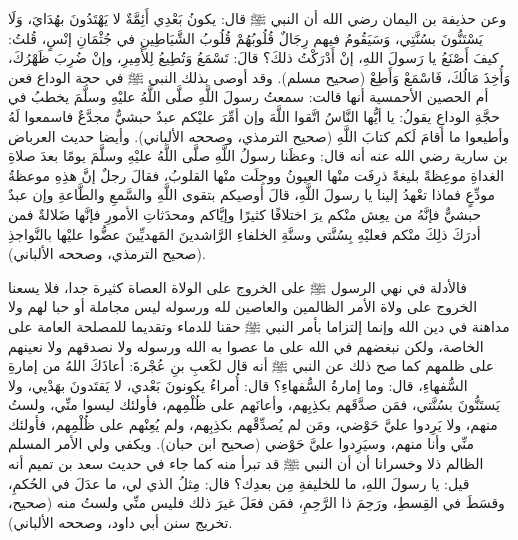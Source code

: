 وعن حذيفة بن اليمان رضي الله أن النبي ﷺ قال: يكونُ بَعْدِي أَئِمَّةٌ لا يَهْتَدُونَ بهُدَايَ، وَلَا يَسْتَنُّونَ بسُنَّتِي، وَسَيَقُومُ فيهم رِجَالٌ قُلُوبُهُمْ قُلُوبُ الشَّيَاطِينِ في جُثْمَانِ إنْسٍ، قُلتُ: كيفَ أَصْنَعُ يا رَسولَ اللهِ، إنْ أَدْرَكْتُ ذلكَ؟ قالَ: تَسْمَعُ وَتُطِيعُ لِلأَمِيرِ، وإنْ ضُرِبَ ظَهْرُكَ، وَأُخِذَ مَالُكَ، فَاسْمَعْ وَأَطِعْ {\footnotesize (صحيح مسلم)}. وقد أوصى بذلك النبي ﷺ في حجة الوداع فعن أم الحصين الأحمسية أنها قالت: سمعتُ رسولَ اللَّهِ صلَّى اللَّهُ عليْهِ وسلَّمَ يخطبُ في حجَّةِ الوداعِ   يقولُ: يا أيُّها النَّاسُ اتَّقوا اللَّهَ وإن أمِّرَ عليْكم عبدٌ حبشيٌّ مجدَّعٌ فاسمعوا لَهُ وأطيعوا ما أقامَ لَكم كتابَ اللَّهِ  {\footnotesize (صحيح الترمذي، وصححه الألباني)}. وأيضا حديث العرباض بن سارية رضي الله عنه أنه قال: وعظَنا رسولُ اللَّهِ صلَّى اللَّهُ عليْهِ وسلَّمَ يومًا بعدَ صلاةِ الغداةِ موعِظةً بليغةً ذرِفَت منْها العيونُ ووجِلَت منْها القلوبُ، فقالَ رجلٌ إنَّ هذِهِ موعظةُ مودِّعٍ فماذا تعْهدُ إلينا يا رسولَ اللَّهِ، قالَ أوصيكم بتقوى اللَّهِ والسَّمعِ والطَّاعةِ وإن عبدٌ حبشيٌّ فإنَّهُ من يعِش منْكم يرَ اختلافًا كثيرًا وإيَّاكم ومحدَثاتِ الأمورِ فإنَّها ضَلالةٌ فمن أدرَكَ ذلِكَ منْكم فعليْهِ بِسُنَّتي وسنَّةِ الخلفاءِ الرَّاشدينَ المَهديِّينَ عضُّوا عليْها بالنَّواجذِ {\footnotesize (صحيح الترمذي، وصححه الألباني)}.

فالأدلة في نهي الرسول ﷺ على الخروج على الولاة العصاة كثيرة جدا، فلا يسعنا الخروج على ولاة الأمر الظالمين والعاصين لله ورسوله ليس مجاملة أو حبا لهم ولا مداهنة في دين الله وإنما إلتزاما بأمر النبي ﷺ حقنا للدماء وتقديما للمصلحة العامة على الخاصة، ولكن نبغضهم في الله على ما عصوا به الله ورسوله ولا نصدقهم ولا نعينهم على ظلمهم كما صح ذلك عن النبي ﷺ أنه قال لكَعبِ بنِ عُجْرةَ: أعاذَكَ اللهُ من إمارةِ السُّفهاءِ، قال: وما إمارةُ السُّفهاءِ؟ قال: أُمراءُ يكونونَ بَعْدي، لا يَقتَدونَ بهَدْيي، ولا يَستَنُّونَ بسُنَّتي، فمَن صدَّقَهم بكذِبِهم، وأعانَهم على ظُلْمِهم، فأولئك ليسوا منِّي، ولستُ منهم، ولا يَرِدوا عليَّ حَوْضي، ومَن لم يُصدِّقْهم بكذِبِهم، ولم يُعِنْهم على ظُلْمِهم، فأولئك منِّي وأنا منهم، وسيَرِدوا عليَّ حَوْضي {\footnotesize (صحيح ابن حبان)}. ويكفي ولي الأمر المسلم الظالم ذلا وخسرانا أن أن النبي ﷺ قد تبرأ منه كما جاء في حديث سعد بن تميم أنه قيل: يا رسولَ اللهِ، ما للخليفةِ مِن بعدِك؟ قال: مِثلُ الذي لي، ما عدَلَ في الحُكمِ، وقسَطَ في القِسطِ، ورَحِمَ ذا الرَّحِمِ، فمَن فعَلَ غيرَ ذلك فليس منِّي ولستُ منه {\footnotesize (صحيح، تخريج سنن أبي داود، وصححه الألباني)}.


